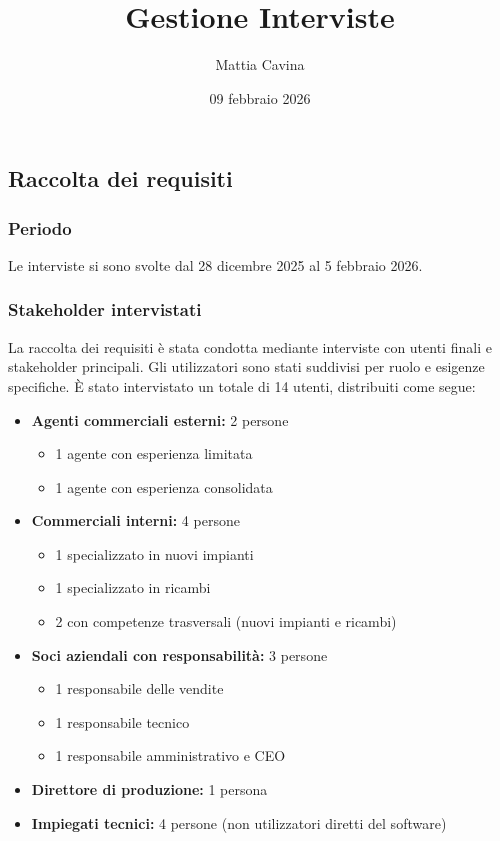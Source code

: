 \documentclass[12pt, a4paper]{article}
\title{Gestione Interviste}
\author{Mattia Cavina}
\date{09 febbraio 2026}
\begin{document}
\subsection{Raccolta dei requisiti}

\subsubsection{Periodo}
Le interviste si sono svolte dal 28 dicembre 2025 al 5 febbraio 2026.

\subsubsection{Stakeholder intervistati}
La raccolta dei requisiti è stata condotta mediante interviste con utenti finali e stakeholder principali. 
Gli utilizzatori sono stati suddivisi per ruolo e esigenze specifiche. È stato intervistato un totale di 14 utenti, distribuiti come segue:

\begin{itemize}
    \item \textbf{Agenti commerciali esterni:} 2 persone
    \begin{itemize}
        \item 1 agente con esperienza limitata
        \item 1 agente con esperienza consolidata
    \end{itemize}
    \item \textbf{Commerciali interni:} 4 persone
    \begin{itemize}
        \item 1 specializzato in nuovi impianti
        \item 1 specializzato in ricambi
        \item 2 con competenze trasversali (nuovi impianti e ricambi)
    \end{itemize}
    \item \textbf{Soci aziendali con responsabilità:} 3 persone
    \begin{itemize}
        \item 1 responsabile delle vendite
        \item 1 responsabile tecnico
        \item 1 responsabile amministrativo e CEO
    \end{itemize}
    \item \textbf{Direttore di produzione:} 1 persona
    \item \textbf{Impiegati tecnici:} 4 persone (non utilizzatori diretti del software)
\end{itemize}
\end{document}
